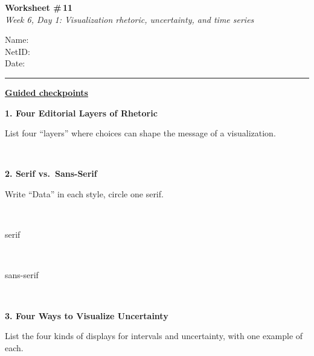 \documentclass[11pt]{article}
\newcommand{\blankspace}[1]{%
  \vspace{0.3em}
  \begin{minipage}[t][#1][t]{\linewidth}
  \end{minipage}
  \vspace{0.3em}
}
\newcommand{\guidedopen}[4]{%
  \noindent\textbf{#1}\\[0.18em]
  \noindent
  \begin{minipage}[t]{0.485\textwidth}
    #2
    \blankspace{#3}
  \end{minipage}
  \hfill
  \begin{minipage}[t]{0.485\textwidth}
    \blankspace{#4}
  \end{minipage}
  \\[0.4em]
}
\newcommand{\panelbox}[3]{%
  \begin{minipage}[t]{\dimexpr#1+2\fboxsep+2\fboxrule\relax}
    \framebox[#1][c]{\rule{0pt}{#2}}%
    \if\relax\detokenize{#3}\relax\else
      \\[0.25em]{\centering\small #3\par}%
    \fi
  \end{minipage}%
}
\begin{document}
\RaggedRight

\noindent
\begin{minipage}[t]{0.55\textwidth}
  \vspace{0pt}
  {\LARGE \textbf{Worksheet \#\,11}} \\[0.18em]
  {\large \textit{Week 6, Day 1: Visualization rhetoric, uncertainty, and time series}}
\end{minipage}
\hfill
\begin{minipage}[t]{0.40\textwidth}
  \vspace{0pt}
  \small
  Name: \underline{\hspace{4.5cm}} \\[0.35em]
  NetID: \underline{\hspace{4.3cm}} \\[0.35em]
  Date: \underline{\hspace{4.4cm}} \\
\end{minipage}

\vspace{0.6em}
\noindent\rule{\linewidth}{0.6pt}
\vspace{0.1em}

\noindent\underline{\textbf{Guided checkpoints}}\\[0.2em]
\vspace{0.8em}

\guidedopen{1. Four Editorial Layers of Rhetoric}{
List four ``layers'' where choices can shape the message of a visualization.
}{2.7cm}{3.6cm}

\vfill

\guidedopen{2. Serif vs.\ Sans-Serif}{
Write ``Data'' in each style, circle one serif.

\vspace{0.45em}

\noindent
\panelbox{3.7cm}{1.6cm}{serif}\hfill
\panelbox{3.7cm}{1.6cm}{sans-serif}
}{0.2cm}{3.2cm}

\vfill

\guidedopen{3. Four Ways to Visualize Uncertainty}{
List the four kinds of displays for intervals and uncertainty, with one example of each.
}{2.7cm}{3.6cm}
\end{document}

